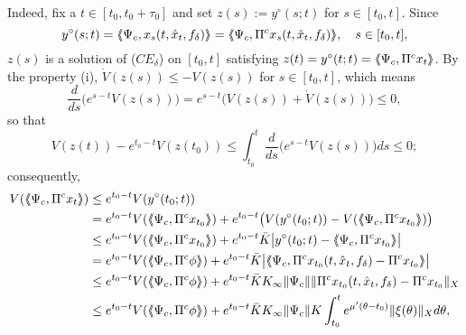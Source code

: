 \documentclass[12pt]{amsart}
\begin{document}
Indeed, fix a $t\in [t_0,t_0+\tau_0]$ and set $z(s):=y^\circ(s;t)$ 
for $s\in [t_0,t]$. Since 
$$
   y^\circ(s;t)
   = {\langle\hspace{-1mm}\langle} \Psi_c, x_{s}(t,\hat x_t,f_\delta) {\rangle\hspace{-1mm}\rangle}
   = {\langle\hspace{-1mm}\langle} \Psi_c, \Pi^cx_{s}(t,\hat x_t,f_\delta) {\rangle\hspace{-1mm}\rangle}, \quad s\in [t_0,t],
$$
$z(s)$ is a solution of ($CE_\delta$) on $[t_0,t]$ satisfying 
$z(t)=y^\circ(t;t)={\langle\hspace{-1mm}\langle}\Psi_c, \Pi^c x_t{\rangle\hspace{-1mm}\rangle}$. By the property (i), 
$\dot V(z(s))\leq -V(z(s))$ for $s\in [t_0,t]$, which means  
$$
   \frac{d}{ds}\big(e^{s-t}V(z(s))\big)
   = e^{s-t}\big(V(z(s))+\dot V(z(s))\big)\leq 0,
$$
so that 
$$
   V(z(t))-e^{t_0-t}V(z(t_0))
   \leq \int_{t_0}^t  \frac{d}{ds}\big(e^{s-t}V(z(s))\big)ds
   \leq 0;
$$
consequently,
\begin{align*}
   V({\langle\hspace{-1mm}\langle}\Psi_c, \Pi^c x_t{\rangle\hspace{-1mm}\rangle}) 
   &\leq e^{t_0-t}V(y^{\circ}(t_0;t)) \\
   &= e^{t_0-t}V({\langle\hspace{-1mm}\langle}\Psi_c, \Pi^c x_{t_0}{\rangle\hspace{-1mm}\rangle})+ e^{t_0-t}\big( V(y^{\circ}(t_0;t))- V({\langle\hspace{-1mm}\langle}\Psi_c, \Pi^c x_{t_0}{\rangle\hspace{-1mm}\rangle})\big) \\
   &\leq e^{t_0-t}V({\langle\hspace{-1mm}\langle}\Psi_c, \Pi^c x_{t_0}{\rangle\hspace{-1mm}\rangle})+ e^{t_0-t} \bar K \big| y^{\circ}(t_0;t)- {\langle\hspace{-1mm}\langle}\Psi_c, \Pi^c x_{t_0}{\rangle\hspace{-1mm}\rangle} \big| \\
   &= e^{t_0-t}V({\langle\hspace{-1mm}\langle}\Psi_c, \Pi^c \phi{\rangle\hspace{-1mm}\rangle})+ e^{t_0-t} \bar K 
      \big|{\langle\hspace{-1mm}\langle} \Psi_c, \Pi^c x_{t_0}(t,\hat x_t,f_\delta) - \Pi^c x_{t_0}{\rangle\hspace{-1mm}\rangle}\big| \\
   &\leq e^{t_0-t}V({\langle\hspace{-1mm}\langle}\Psi_c, \Pi^c \phi{\rangle\hspace{-1mm}\rangle})+ e^{t_0-t} \bar K K_\infty\|\Psi_c\|  
                \|\Pi^c x_{t_0}(t,\hat x_t,f_\delta) - \Pi^c x_{t_0}\|_X  \\
   &\leq e^{t_0-t}V({\langle\hspace{-1mm}\langle}\Psi_c, \Pi^c \phi {\rangle\hspace{-1mm}\rangle})+ e^{t_0-t} \bar K K_\infty \|\Psi_c\|
           K\int_{t_0}^t e^{\mu'(\theta-t_0)}\|\xi(\theta)\|_Xd\theta,      
\end{align*}
\end{document}
